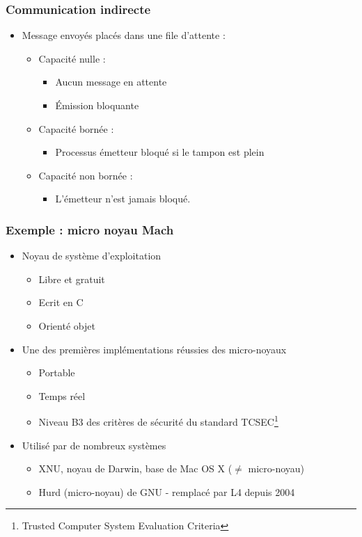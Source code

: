 \begin{frame}
\frametitle{Communication indirecte}
\begin{itemize}
\item Message envoyés placés dans une file d’attente :
\begin{itemize}
\item Capacité nulle : 
\begin{itemize}
\item Aucun message en attente
\item Émission bloquante
\end{itemize}
\item Capacité bornée :
\begin{itemize}
\item Processus émetteur bloqué si le tampon est plein
\end{itemize}
\item Capacité non bornée :
\begin{itemize}
\item L’émetteur n’est jamais bloqué.
\end{itemize}
\end{itemize}
\end{itemize}
\end{frame}

\begin{frame}
\frametitle{Exemple : micro noyau Mach}
\begin{itemize}
\item Noyau de système d'exploitation
\begin{itemize}
\item Libre et gratuit
\item Ecrit en C
\item Orienté objet
\end{itemize}
\item Une des premières implémentations réussies des micro-noyaux
\begin{itemize}
\item Portable
\item Temps réel
\item Niveau B3 des critères de sécurité du standard TCSEC\footnote{Trusted Computer System Evaluation Criteria}
\end{itemize}
\item Utilisé par de nombreux systèmes
\begin{itemize}
\item XNU, noyau de Darwin, base de Mac OS X ($\ne$ micro-noyau)
\item Hurd (micro-noyau) de GNU - remplacé par L4 depuis 2004
\end{itemize}

\end{itemize}
\end{frame}

